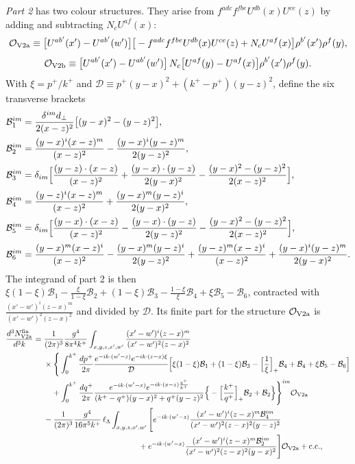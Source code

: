 \emph{Part 2} has two colour structures. They arise from $f^{adc}f^{fbe}U^{db}(x)U^{ce}(z)$ by adding and subtracting $N_cU^{af}(x)$:
\begin{equation}
\mathcal{O}_{\rm V2a}\equiv\big[U^{ab'}(x')-U^{ab'}(w')\big]\big[-f^{adc}f^{fbe}U^{db}(x)U^{ce}(z)+N_cU^{af}(x)\big]\rho^{b'}(x')\rho^f(y),
\end{equation}
\begin{equation}
\mathcal{O}_{\rm V2b}\equiv\big[U^{ab'}(x')-U^{ab'}(w')\big]\,N_c\big[U^{af}(y)-U^{af}(x)\big]\rho^{b'}(x')\rho^f(y).
\end{equation}
With $\xi=p^+/k^+$ and $\mathcal D\equiv p^+(y-x)^2+(k^+-p^+)(y-z)^2$, define the six transverse brackets
\begin{align}
\mathcal B_1^{im}&=\frac{\delta^{im}d_\perp}{2(x-z)^2}\big[(y-x)^2-(y-z)^2\big],\notag\\
\mathcal B_2^{im}&=\frac{(y-x)^i(x-z)^m}{(x-z)^2}-\frac{(y-x)^i(y-z)^m}{2(y-z)^2},\notag\\
\mathcal B_3^{im}&=\delta_{im}\Big[\frac{(y-z)\cdot(x-z)}{(x-z)^2}+\frac{(y-x)\cdot(y-z)}{2(y-x)^2}-\frac{(y-x)^2-(y-z)^2}{2(x-z)^2}\Big],\notag\\
\mathcal B_4^{im}&=\frac{(y-z)^i(x-z)^m}{(x-z)^2}+\frac{(y-x)^m(y-z)^i}{2(y-x)^2},\notag\\
\mathcal B_5^{im}&=\delta_{im}\Big[\frac{(y-x)\cdot(x-z)}{(x-z)^2}-\frac{(y-x)\cdot(y-z)}{2(y-z)^2}-\frac{(y-x)^2-(y-z)^2}{2(x-z)^2}\Big],\notag\\
\mathcal B_6^{im}&=\frac{(y-x)^m(x-z)^i}{(x-z)^2}-\frac{(y-x)^m(y-z)^i}{2(y-z)^2}+\frac{(y-z)^m(x-z)^i}{(x-z)^2}+\frac{(y-x)^i(y-z)^m}{2(y-x)^2}.
\label{eq:B16}
\end{align}
The integrand of part 2 is then $\xi(1-\xi)\mathcal B_1-\frac{\xi}{1-\xi}\mathcal B_2+(1-\xi)\mathcal B_3-\frac{1-\xi}{\xi}\mathcal B_4+\xi\mathcal B_5-\mathcal B_6$, contracted with $\frac{(x'-w')^i(z-x)^m}{(x'-w')^2(z-x)^2}$ and divided by $\mathcal D$. Its finite part for the structure $\mathcal{O}_{\rm V2a}$ is
\begin{align}
\frac{d^3N^{\rm fin}_{\rm V2a}}{d^3k}={}&\frac{1}{(2\pi)^3}\frac{g^4}{8\pi^4k^+}\int_{x,y,z,x',w'}\frac{(x'-w')^i(z-x)^m}{(x'-w')^2(z-x)^2}\notag\\
&\times\Bigg\{\int_0^{k^+}\frac{dp^+}{2\pi}\frac{e^{-ik\cdot(w'-z)}e^{-ik\cdot(z-x)\xi}}{\mathcal D}\Big[\xi(1-\xi)\mathcal B_1+(1-\xi)\mathcal B_3-\Big[\frac1\xi\Big]_+\mathcal B_4+\mathcal B_4+\xi\mathcal B_5-\mathcal B_6\Big]\notag\\
&\quad+\int_0^{k^+}\frac{dq^+}{2\pi}\frac{e^{-ik\cdot(w'-x)}e^{-ik\cdot(x-z)\frac{q^+}{k^+}}}{(k^+-q^+)(y-x)^2+q^+(y-z)^2}\Big\{-\Big[\frac{k^+}{q^+}\Big]_+\mathcal B_2+\mathcal B_2\Big\}\Bigg\}^{im}\Ord_{\rm V2a}\notag\\
&-\frac{1}{(2\pi)^3}\frac{g^4}{16\pi^5k^+}\,\lL\int_{x,y,z,x',w'}\Bigg[e^{-ik\cdot(w'-z)}\frac{(x'-w')^i(z-x)^m\mathcal B_4^{im}}{(x'-w')^2(z-x)^2(y-z)^2}\notag\\
&\hspace{12em}+e^{-ik\cdot(w'-x)}\frac{(x'-w')^i(z-x)^m\mathcal B_2^{im}}{(x'-w')^2(z-x)^2(y-x)^2}\Bigg]\Ord_{\rm V2a}+{\rm c.c.},
\label{eq:finV2a}
\end{align}
